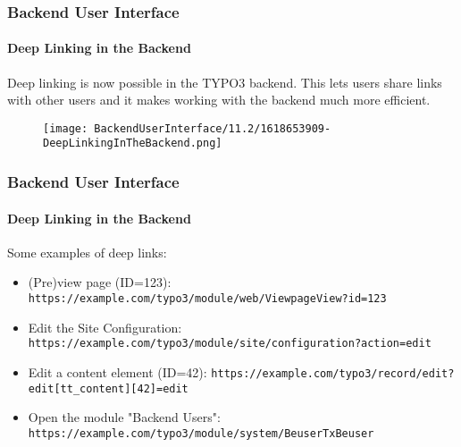 %

\begin{frame}[fragile]
	\frametitle{Backend User Interface}
	\framesubtitle{Deep Linking in the Backend}

	Deep linking is now possible in the TYPO3 backend. This lets users share links
	with other users and it makes working with the backend much more efficient.

	\begin{figure}
		\texttt{[image: BackendUserInterface/11.2/1618653909-DeepLinkingInTheBackend.png]}
	\end{figure}

\end{frame}


\begin{frame}[fragile]
	\frametitle{Backend User Interface}
	\framesubtitle{Deep Linking in the Backend}

	Some examples of deep links:
	\vspace{0.2cm}
	\begin{itemize}
		\item (Pre)view page (ID=123):\newline
			\fontsize{8}{10}\texttt{https://example.com/typo3/module/web/ViewpageView?id=123}\normalsize
		\item Edit the Site Configuration:
			\fontsize{8}{10}\texttt{https://example.com/typo3/module/site/configuration?action=edit}\normalsize
		\item Edit a content element (ID=42):
			\fontsize{8}{10}\texttt{https://example.com/typo3/record/edit?edit[tt\_content][42]=edit}\normalsize
		\item Open the module "Backend Users":
			\fontsize{8}{10}\texttt{https://example.com/typo3/module/system/BeuserTxBeuser}\normalsize
	\end{itemize}

\end{frame}

